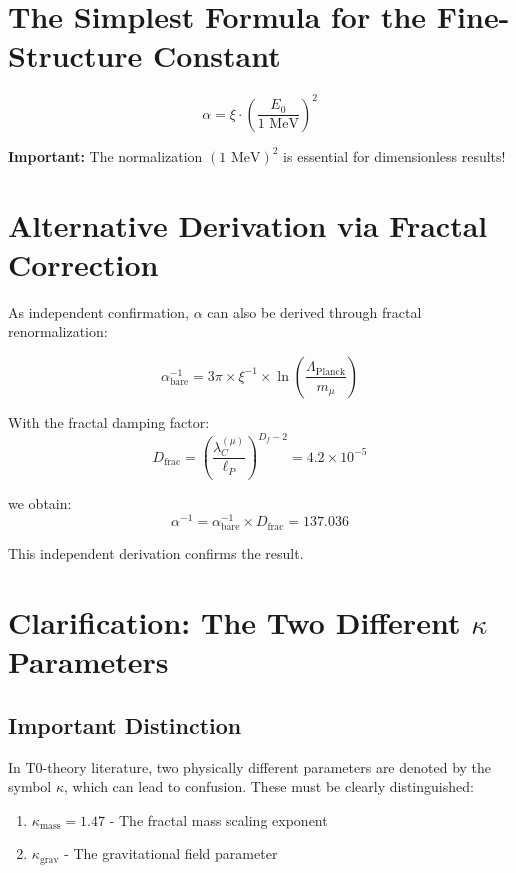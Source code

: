 \section*{The Simplest Formula for the Fine-Structure Constant}

\[
\boxed{\alpha = \xi \cdot \left(\frac{E_0}{1 \text{ MeV}}\right)^2}
\]
\begin{tcolorbox}[colback=red!5!white,colframe=red!75!black]
	\textbf{Important:} The normalization $(1 \text{ MeV})^2$ is essential for dimensionless results!
\end{tcolorbox}	
	\section{Alternative Derivation via Fractal Correction}
	
	As independent confirmation, $\alpha$ can also be derived through fractal renormalization:
	
	\begin{equation}
		\alpha_{\text{bare}}^{-1} = 3\pi \times \xi^{-1} \times \ln\left(\frac{\Lambda_{\text{Planck}}}{m_\mu}\right)
	\end{equation}
	
	With the fractal damping factor:
	\begin{equation}
		D_{\text{frac}} = \left(\frac{\lambda_C^{(\mu)}}{\ell_P}\right)^{D_f-2} = 4.2 \times 10^{-5}
	\end{equation}
	
	we obtain:
	\begin{equation}
		\alpha^{-1} = \alpha_{\text{bare}}^{-1} \times D_{\text{frac}} = 137.036
	\end{equation}
	
	This independent derivation confirms the result.
	
	\section{Clarification: The Two Different $\kappa$ Parameters}
	
	\subsection{Important Distinction}
	
	In T0-theory literature, two physically different parameters are denoted by the symbol $\kappa$, which can lead to confusion. These must be clearly distinguished:
	
	\begin{enumerate}
		\item $\kappa_{\text{mass}} = 1.47$ - The fractal mass scaling exponent
		\item $\kappa_{\text{grav}}$ - The gravitational field parameter
	\end{enumerate}
	
